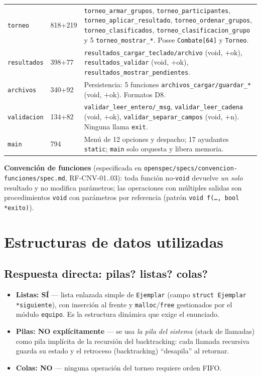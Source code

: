 \documentclass[11pt,a4paper]{article}
\begin{document}
\begin{longtable}{p{3.2cm} p{4.6cm} p{7.4cm}}
\texttt{torneo} & 818+219 & \texttt{torneo\_armar\_grupos}, \texttt{torneo\_participantes}, \texttt{torneo\_aplicar\_resultado}, \texttt{torneo\_ordenar\_grupos}, \texttt{torneo\_clasificados}, \texttt{torneo\_clasificacion\_grupo} y 5 \texttt{torneo\_mostrar\_*}. Posee \texttt{Combate[64]} y \texttt{Torneo}. \\
\texttt{resultados} & 398+77 & \texttt{resultados\_cargar\_teclado/archivo} (void, $+$ok), \texttt{resultados\_validar} (void, $+$ok), \texttt{resultados\_mostrar\_pendientes}. \\
\texttt{archivos} & 340+92 & Persistencia: 5 funciones \texttt{archivos\_cargar/guardar\_*} (void, $+$ok). Formatos D8. \\
\texttt{validacion} & 134+82 & \texttt{validar\_leer\_entero/\_msg}, \texttt{validar\_leer\_cadena} (void, $+$ok), \texttt{validar\_separar\_campos} (void, $+$n). Ninguna llama \texttt{exit}. \\
\texttt{main} & 794 & Men\'u de 12 opciones y despacho; 17 ayudantes \texttt{static}; \texttt{main} solo orquesta y libera memoria. \\
\bottomrule
\end{longtable}

\textbf{Convenci\'on de funciones} (especificada en
\texttt{openspec/specs/convencion-funciones/spec.md}, RF-CNV-01..03): toda
funci\'on no-\texttt{void} devuelve \emph{un solo} resultado y no modifica
par\'ametros; las operaciones con m\'ultiples salidas son procedimientos
\texttt{void} con par\'ametros por referencia (patr\'on
\texttt{void f(\dots, bool *exito)}).

\section{Estructuras de datos utilizadas}

\subsection{Respuesta directa: \textquestiondown pilas? \textquestiondown listas? \textquestiondown colas?}

\begin{itemize}
\item \textbf{Listas: S\'I} — lista enlazada simple de \texttt{Ejemplar} (campo
  \texttt{struct Ejemplar *siguiente}), con inserci\'on al frente y
  \texttt{malloc}/\texttt{free} gestionados por el m\'odulo \texttt{equipo}.
  Es la estructura din\'amica que exige el enunciado.
\item \textbf{Pilas: NO expl\'icitamente} — se usa \emph{la pila del sistema}
  (stack de llamadas) como pila impl\'icita de la recursi\'on del backtracking:
  cada llamada recursiva guarda su estado y el retroceso (backtracking) ``desapila''
  al retornar.
\item \textbf{Colas: NO} — ninguna operaci\'on del torneo requiere orden FIFO.
\end{itemize}
\end{document}
